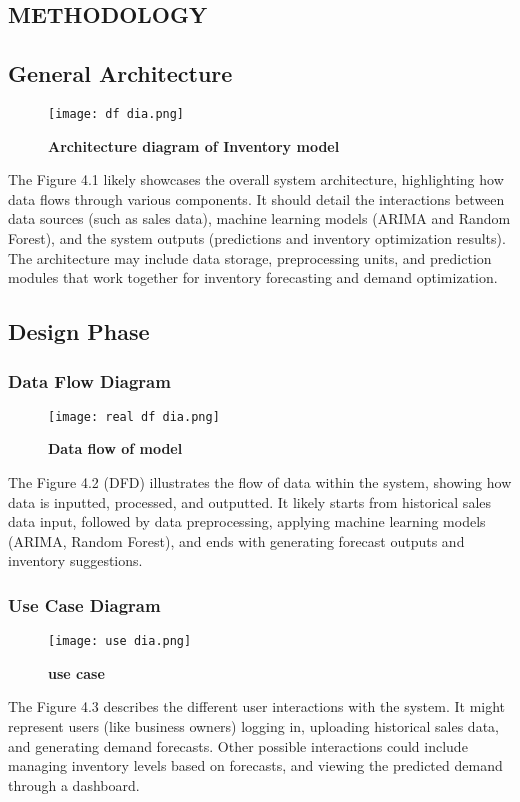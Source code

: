 \documentclass[10pt]{report}
\begin{document}
\begin{center}
\chapter{METHODOLOGY}
\linespread{1.5}
\section{General Architecture}
\begin{figure}[H]
 \centering
 \texttt{[image: df dia.png]}
 \caption{\textbf{Architecture diagram of Inventory model}}
\end{figure}


The Figure 4.1 likely showcases the overall system architecture, highlighting how data flows through various components. It should detail the interactions between data sources (such as sales data), machine learning models (ARIMA and Random Forest), and the system outputs (predictions and inventory optimization results). The architecture may include data storage, preprocessing units, and prediction modules that work together for inventory forecasting and demand optimization.
\section{Design Phase }
\subsection{Data Flow Diagram}
\begin{figure}[H]
 \centering
 \texttt{[image: real df dia.png]}
 \caption{\textbf{Data flow of model}}
\end{figure}

The Figure 4.2 (DFD) illustrates the flow of data within the system, showing how data is inputted, processed, and outputted. It likely starts from historical sales data input, followed by data preprocessing, applying machine learning models (ARIMA, Random Forest), and ends with generating forecast outputs and inventory suggestions.
\subsection{Use Case Diagram}
\begin{figure}[H]
 \centering
 \texttt{[image: use dia.png]}
 \caption{\textbf{use case}}
\end{figure}
The Figure 4.3 describes the different user interactions with the system. It might represent users (like business owners) logging in, uploading historical sales data, and generating demand forecasts. Other possible interactions could include managing inventory levels based on forecasts, and viewing the predicted demand through a dashboard.

\end{center}
\end{document}
